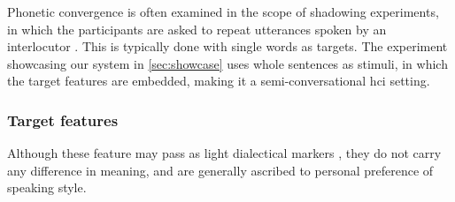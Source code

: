 Phonetic convergence is often examined in the scope of shadowing experiments, in which the participants are asked to repeat utterances spoken by an interlocutor \citep[e.g.,][]{Pardo2017phonetic, Dias2016visibilivty, Walker2015repeat, Shockley2004imitation}.
This is typically done with single words as targets.
The experiment showcasing our system in \cref{sec:showcase} uses whole sentences as stimuli, in which the target features are embedded, making it a semi-conversational \ac{hci} setting.

\subsubsection{Target features}
\label{subsec:target_features_HCIConv}


Although these feature may pass as light dialectical markers \citep{Mitterer2013regional}, they do not carry any difference in meaning, and are generally ascribed to personal preference of speaking style.

